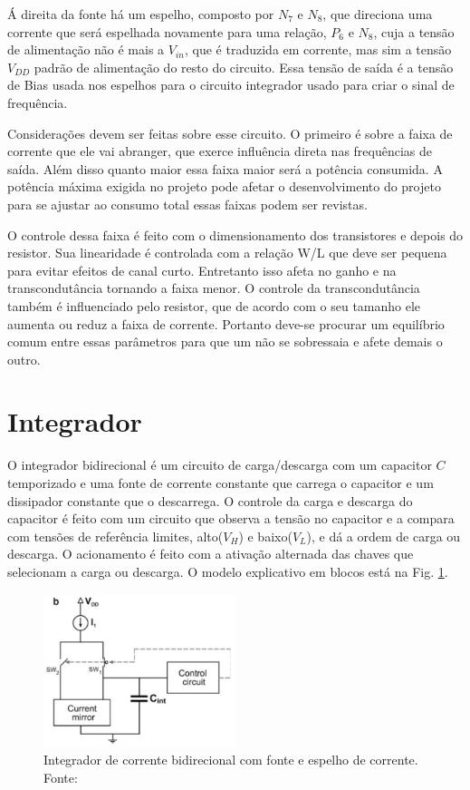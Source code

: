  Á direita da fonte há um espelho, composto por $N_7$ e $N_8$, que direciona uma corrente que será espelhada novamente para uma relação, $P_6$ e $N_8$, cuja a tensão de alimentação não é mais a $V_{in}$, que é traduzida em corrente, mas sim a tensão $V_{DD}$ padrão de alimentação do resto do circuito. Essa tensão de saída é a tensão de Bias usada nos espelhos para o circuito integrador usado para criar o sinal de frequência.

Considerações devem ser feitas sobre esse circuito. O primeiro é sobre a faixa de corrente que ele vai abranger, que exerce influência direta nas frequências de saída. Além disso quanto maior essa faixa maior será a potência consumida. A potência máxima exigida no projeto pode afetar o desenvolvimento do projeto para se ajustar ao consumo total essas faixas podem ser revistas.

 O controle dessa faixa é feito com o dimensionamento dos transistores e depois do resistor. Sua linearidade é controlada com a relação W/L que deve ser pequena para evitar efeitos de canal curto. Entretanto isso afeta no ganho e na transcondutância tornando a faixa menor. O controle da transcondutância também é influenciado pelo resistor, que de acordo com o seu tamanho ele aumenta ou reduz a faixa de corrente. Portanto deve-se procurar um equilíbrio comum entre essas parâmetros para que um não se sobressaia e afete demais o outro.


\section{Integrador} 

O integrador bidirecional é um circuito de carga/descarga com um capacitor $C$ temporizado e uma fonte de corrente constante que carrega o capacitor e um dissipador constante que o descarrega. O controle da carga e descarga do capacitor é feito com um circuito que observa a tensão no capacitor e a compara com tensões de referência limites, alto($V_H$) e baixo($V_L$), e dá a ordem de carga ou descarga. O acionamento é feito com a ativação alternada das chaves que selecionam a carga ou descarga. 
O modelo explicativo em blocos está na Fig. \ref{fig08}.

\begin{figure}[htb]
	\centering
	\includegraphics[width=0.5\textwidth]{figuras/integrador_sch.png}
	\caption{Integrador de corrente bidirecional com fonte e espelho de corrente. Fonte:\cite{livroprincipal} }
	\label{fig08}
\end{figure}

